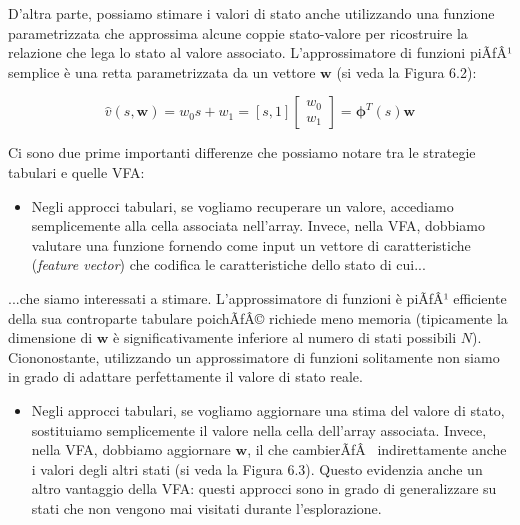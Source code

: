 ﻿\documentclass[11pt, a4paper]{report}
\begin{document}
D'altra parte, possiamo stimare i valori di stato anche utilizzando una funzione parametrizzata che approssima alcune coppie stato-valore per ricostruire la relazione che lega lo stato al valore associato. L'approssimatore di funzioni piÃƒÂ¹ semplice è una retta parametrizzata da un vettore $\bm{w}$ (si veda la Figura 6.2):

\[
\hat{v}(s, \bm{w}) = w_0 s + w_1 = [s, 1] \begin{bmatrix} w_0 \\ w_1 \end{bmatrix} = \bm{\phi}^T(s)\bm{w} \tag{6.1}
\]

Ci sono due prime importanti differenze che possiamo notare tra le strategie tabulari e quelle VFA:

\begin{itemize}
    \item Negli approcci tabulari, se vogliamo recuperare un valore, accediamo semplicemente alla cella associata nell'array. Invece, nella VFA, dobbiamo valutare una funzione fornendo come input un vettore di caratteristiche (\emph{feature vector}) che codifica le caratteristiche dello stato di cui...
\end{itemize}


\newpage



...che siamo interessati a stimare. L'approssimatore di funzioni è piÃƒÂ¹ efficiente della sua controparte tabulare poichÃƒÂ© richiede meno memoria (tipicamente la dimensione di $\bm{w}$ è significativamente inferiore al numero di stati possibili $N$). Ciononostante, utilizzando un approssimatore di funzioni solitamente non siamo in grado di adattare perfettamente il valore di stato reale.

\begin{itemize}
    \item Negli approcci tabulari, se vogliamo aggiornare una stima del valore di stato, sostituiamo semplicemente il valore nella cella dell'array associata. Invece, nella VFA, dobbiamo aggiornare $\bm{w}$, il che cambierÃƒÂ  indirettamente anche i valori degli altri stati (si veda la Figura 6.3). Questo evidenzia anche un altro vantaggio della VFA: questi approcci sono in grado di generalizzare su stati che non vengono mai visitati durante l'esplorazione.
\end{itemize}
\end{document}
